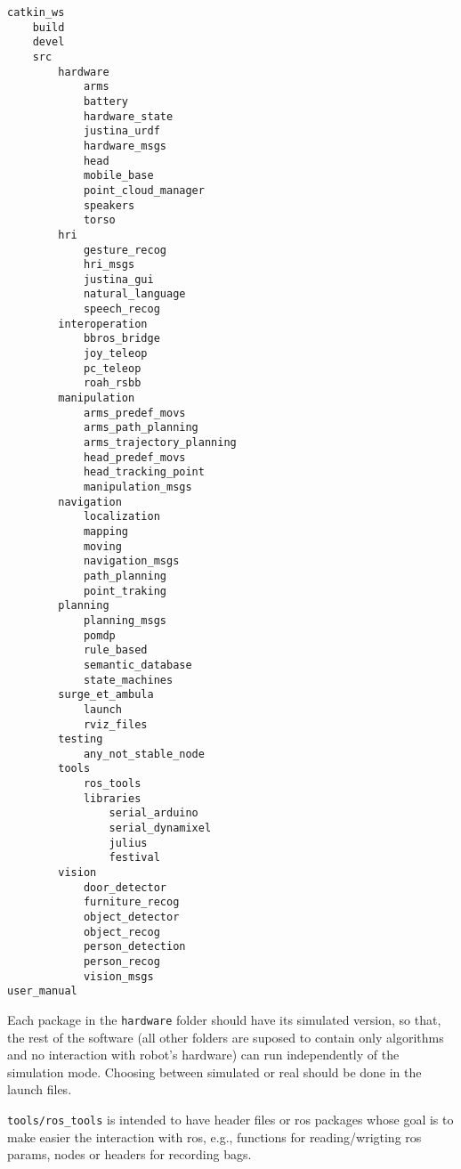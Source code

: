 \documentclass[letterpaper,10pt]{article}
\begin{document}
\begin{verbatim}
catkin_ws
    build
    devel
    src
        hardware
            arms
            battery
            hardware_state
            justina_urdf
            hardware_msgs
            head
            mobile_base
            point_cloud_manager
            speakers
            torso
        hri
            gesture_recog
            hri_msgs
            justina_gui
            natural_language
            speech_recog
        interoperation
            bbros_bridge
            joy_teleop
            pc_teleop
            roah_rsbb
        manipulation
            arms_predef_movs
            arms_path_planning
            arms_trajectory_planning
            head_predef_movs
            head_tracking_point
            manipulation_msgs
        navigation
            localization
            mapping
            moving
            navigation_msgs
            path_planning
            point_traking
        planning
            planning_msgs
            pomdp
            rule_based
            semantic_database
            state_machines
        surge_et_ambula
            launch
            rviz_files
        testing
            any_not_stable_node
        tools
            ros_tools
            libraries
                serial_arduino
                serial_dynamixel
                julius
                festival
        vision
            door_detector
            furniture_recog
            object_detector
            object_recog
            person_detection
            person_recog
            vision_msgs
user_manual
\end{verbatim}


Each package in the \texttt{hardware} folder should have its simulated version, so that, the rest of the software (all other folders are suposed to contain only algorithms and no interaction with robot's hardware) can run independently of the simulation mode. Choosing between simulated or real should be done in the launch files. 

\texttt{tools/ros\_tools} is intended to have header files or ros packages whose goal is to make easier the interaction with ros, e.g., functions for reading/wrigting ros params, nodes or headers for recording bags. 
\end{document}
